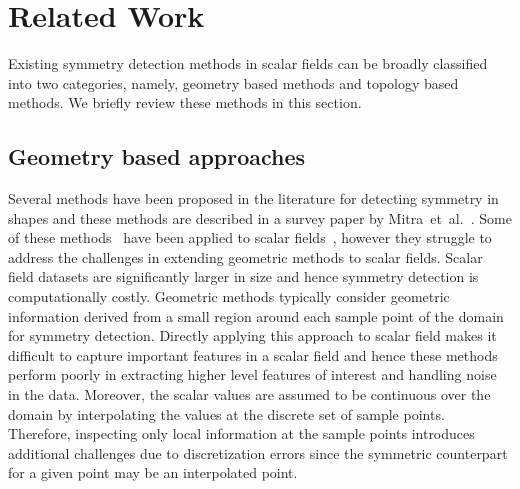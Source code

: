 \documentclass[review,journal]{vgtc}         %
\begin{document}
\section{Related Work}
Existing symmetry detection methods in scalar fields can be broadly classified into two
categories, namely, geometry based methods and topology based methods. We briefly review
these methods in this section.
\subsection{Geometry based approaches}
Several methods have been proposed in the literature for detecting
symmetry in shapes and these methods are described in a survey paper by
Mitra~et~al.~\cite{MitPWC2012}. Some of these methods~\cite{Mitra06,KazhdanCDFR03,BokBWSS09} have 
been applied to scalar fields~\cite{MasoodTN13,HongS08,kerbWKS11}, however they struggle to address 
the challenges in extending geometric methods to scalar fields.
Scalar field datasets are significantly larger in size and hence symmetry detection is computationally costly.
Geometric methods typically consider geometric information derived from a small region around each sample
point of the domain for symmetry detection. Directly applying this approach to scalar field makes it difficult 
to capture important features in a scalar field and hence these methods perform poorly in extracting higher level
features of interest and handling noise in the data.
Moreover, the scalar values are assumed to be continuous over the domain by interpolating the values at 
the discrete set of sample points. Therefore, inspecting only local information at the sample points
introduces additional challenges due to discretization errors since the symmetric counterpart for a 
given point may be an interpolated point.
\end{document}

